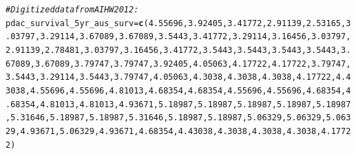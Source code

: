 \documentclass{article}\usepackage[]{graphicx}\usepackage[]{color}
\makeatletter
\newcommand{\hlnum}[1]{\textcolor[rgb]{0.686,0.059,0.569}{#1}}%
\newcommand{\hlcom}[1]{\textcolor[rgb]{0.678,0.584,0.686}{\textit{#1}}}%
\newcommand{\hlstd}[1]{\textcolor[rgb]{0.345,0.345,0.345}{#1}}%
\newcommand{\hlkwb}[1]{\textcolor[rgb]{0.69,0.353,0.396}{#1}}%
\newcommand{\hlkwd}[1]{\textcolor[rgb]{0.737,0.353,0.396}{\textbf{#1}}}%
\newenvironment{kframe}{%
 \def\at@end@of@kframe{}%
 \ifinner\ifhmode%
  \def\at@end@of@kframe{\end{minipage}}%
  \begin{minipage}{\columnwidth}%
 \fi\fi%
 \def\FrameCommand##1{\hskip\@totalleftmargin \hskip-\fboxsep
 \colorbox{shadecolor}{##1}\hskip-\fboxsep
     \hskip-\linewidth \hskip-\@totalleftmargin \hskip\columnwidth}%
 \MakeFramed {\advance\hsize-\width
   \@totalleftmargin\z@ \linewidth\hsize
   \@setminipage}}%
 {\par\unskip\endMakeFramed%
 \at@end@of@kframe}
\newenvironment{knitrout}{}{} %
\makeatother
\begin{document}
\begin{knitrout}
\color{fgcolor}\begin{kframe}
\begin{alltt}
\hlcom{# Digitized data from AIHW2012:}
\hlstd{pdac_survival_5yr_aus_surv} \hlkwb{=} \hlkwd{c}\hlstd{(}\hlnum{4.55696}\hlstd{,} \hlnum{3.92405}\hlstd{,} \hlnum{3.41772}\hlstd{,} \hlnum{2.91139}\hlstd{,} \hlnum{2.53165}\hlstd{,} \hlnum{3.03797}\hlstd{,} \hlnum{3.29114}\hlstd{,} \hlnum{3.67089}\hlstd{,} \hlnum{3.67089}\hlstd{,} \hlnum{3.5443}\hlstd{,} \hlnum{3.41772}\hlstd{,} \hlnum{3.29114}\hlstd{,} \hlnum{3.16456}\hlstd{,} \hlnum{3.03797}\hlstd{,} \hlnum{2.91139}\hlstd{,} \hlnum{2.78481}\hlstd{,} \hlnum{3.03797}\hlstd{,} \hlnum{3.16456}\hlstd{,} \hlnum{3.41772}\hlstd{,} \hlnum{3.5443}\hlstd{,} \hlnum{3.5443}\hlstd{,} \hlnum{3.5443}\hlstd{,} \hlnum{3.5443}\hlstd{,} \hlnum{3.67089}\hlstd{,} \hlnum{3.67089}\hlstd{,} \hlnum{3.79747}\hlstd{,} \hlnum{3.79747}\hlstd{,} \hlnum{3.92405}\hlstd{,} \hlnum{4.05063}\hlstd{,} \hlnum{4.17722}\hlstd{,} \hlnum{4.17722}\hlstd{,} \hlnum{3.79747}\hlstd{,} \hlnum{3.5443}\hlstd{,} \hlnum{3.29114}\hlstd{,} \hlnum{3.5443}\hlstd{,} \hlnum{3.79747}\hlstd{,} \hlnum{4.05063}\hlstd{,} \hlnum{4.3038}\hlstd{,} \hlnum{4.3038}\hlstd{,} \hlnum{4.3038}\hlstd{,} \hlnum{4.17722}\hlstd{,} \hlnum{4.43038}\hlstd{,} \hlnum{4.55696}\hlstd{,} \hlnum{4.55696}\hlstd{,} \hlnum{4.81013}\hlstd{,} \hlnum{4.68354}\hlstd{,} \hlnum{4.68354}\hlstd{,} \hlnum{4.55696}\hlstd{,} \hlnum{4.55696}\hlstd{,} \hlnum{4.68354}\hlstd{,} \hlnum{4.68354}\hlstd{,} \hlnum{4.81013}\hlstd{,} \hlnum{4.81013}\hlstd{,} \hlnum{4.93671}\hlstd{,} \hlnum{5.18987}\hlstd{,} \hlnum{5.18987}\hlstd{,} \hlnum{5.18987}\hlstd{,} \hlnum{5.18987}\hlstd{,} \hlnum{5.18987}\hlstd{,} \hlnum{5.31646}\hlstd{,} \hlnum{5.18987}\hlstd{,} \hlnum{5.18987}\hlstd{,} \hlnum{5.31646}\hlstd{,} \hlnum{5.18987}\hlstd{,} \hlnum{5.18987}\hlstd{,} \hlnum{5.06329}\hlstd{,} \hlnum{5.06329}\hlstd{,} \hlnum{5.06329}\hlstd{,} \hlnum{4.93671}\hlstd{,} \hlnum{5.06329}\hlstd{,} \hlnum{4.93671}\hlstd{,} \hlnum{4.68354}\hlstd{,} \hlnum{4.43038}\hlstd{,} \hlnum{4.3038}\hlstd{,} \hlnum{4.3038}\hlstd{,} \hlnum{4.3038}\hlstd{,} \hlnum{4.17722}\hlstd{)}

\end{alltt}
\end{kframe}
\end{knitrout}
\end{document}
